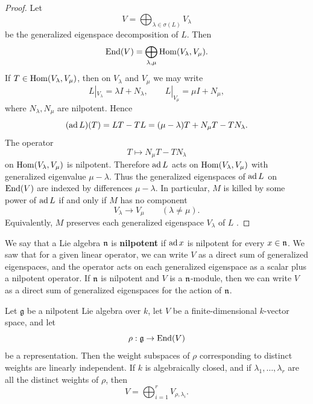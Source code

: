 \documentclass[12pt]{article}
\begin{document}
\begin{proof}

    Let
    \[
        V=\bigoplus_{\lambda\in \sigma(L)}V_\lambda
    \]
    be the generalized eigenspace decomposition of \(L\). Then
    \[
        \operatorname{End}(V)=\bigoplus_{\lambda,\mu}\operatorname{Hom}(V_\lambda,V_\mu).
    \]
    If \(T\in \operatorname{Hom}(V_\lambda,V_\mu)\), then on \(V_\lambda\) and \(V_\mu\) we may write
    \[
        L|_{V_\lambda}=\lambda I+N_\lambda,
        \qquad
        L|_{V_\mu}=\mu I+N_\mu,
    \]
    where \(N_\lambda,N_\mu\) are nilpotent. Hence
    \[
        (\operatorname{ad} L)(T)=LT-TL
        =(\mu-\lambda)T+N_\mu T-TN_\lambda.
    \]
    The operator
    \[
        T\mapsto N_\mu T-TN_\lambda
    \]
    on \(\operatorname{Hom}(V_\lambda,V_\mu)\) is nilpotent. Therefore \(\operatorname{ad} L\) acts on
    \(\operatorname{Hom}(V_\lambda,V_\mu)\) with generalized eigenvalue \(\mu-\lambda\). Thus the generalized eigenspaces of \(\operatorname{ad} L\) on \(\operatorname{End}(V)\) are indexed by
    differences \(\mu-\lambda\). In particular, \(M\) is killed by some power of
    \(\operatorname{ad} L\) if and only if \(M\) has no component
    \[
        V_\lambda\to V_\mu
        \qquad (\lambda\neq \mu).
    \]
    Equivalently, \(M\) preserves each generalized eigenspace \(V_\lambda\) of \(L\) \qedhere.
\end{proof}

We say that a Lie algebra $\mathfrak{n}$ is \textbf{nilpotent} if $\operatorname{ad} x$ is nilpotent for every $x\in \mathfrak{n}$. We saw that for a given linear operator, we can write $V$ as a direct sum of generalized eigenspaces, and the operator acts on each generalized eigenspace as a scalar plus a nilpotent operator. If $\mathfrak{n}$ is nilpotent and $V$ is a $\mathfrak{n}$-module, then we can write $V$ as a direct sum of generalized eigenspaces for the action of $\mathfrak{n}$.

\begin{theorem}
    Let $\mathfrak g$ be a nilpotent Lie algebra over $k$, let $V$ be a
    finite-dimensional $k$-vector space, and let
    \[
        \rho:\mathfrak g\to \operatorname{End}(V)
    \]
    be a representation. Then the weight subspaces of $\rho$ corresponding to
    distinct weights are linearly independent. If $k$ is algebraically closed, and if $\lambda_1,\dots,\lambda_r$ are all the
    distinct weights of $\rho$, then
    \[
        V=\bigoplus_{i=1}^r V_{\rho,\lambda_i}.
    \]
\end{theorem}
\end{document}
